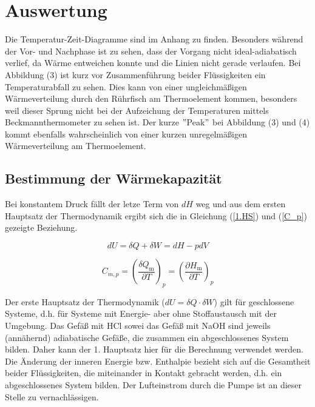 \documentclass[12pt,a4paper,titlepage,headinclude,bibtotoc]{scrartcl}
\begin{document}
\newpage
\section{Auswertung}
Die Temperatur-Zeit-Diagramme sind im Anhang zu finden. Besonders während der Vor- und Nachphase ist zu sehen, dass der Vorgang nicht ideal-adiabatisch verlief, da Wärme entweichen konnte und die Linien nicht gerade verlaufen. Bei Abbildung (3)
ist kurz vor Zusammenführung beider Flüssigkeiten ein Temperaturabfall zu sehen. Dies kann von einer ungleichmäßigen Wärmeverteilung durch den Rührfisch am Thermoelement kommen, besonders weil dieser Sprung nicht bei der Aufzeichung der Temperaturen mittels Beckmannthermometer zu sehen ist. Der kurze $"$Peak$"$ bei Abbildung (3)
und (4)
 kommt ebenfalls wahrscheinlich von einer kurzen unregelmäßigen Wärmeverteilung am Thermoelement.\\

\subsection{Bestimmung der Wärmekapazität}

Bei konstantem Druck fällt der letze Term von $dH$ weg und aus dem ersten Hauptsatz der Thermodynamik ergibt sich die in Gleichung (\ref{1.HS}) und (\ref{C_p}) gezeigte Beziehung.

\begin{equation} \label{1.HS}
dU= \delta Q+ \delta W= dH- pdV
\end{equation}

\begin{equation}\label{C_p}
C_{\mathit{m},p}= \left(\frac{\delta Q_\mathrm{m}}{\partial T}\right)_p =\left(\frac{\partial H_\mathrm{m}}{\partial T}\right)_p
\end{equation}

Der erste Hauptsatz der Thermodynamik ($dU= \delta Q \cdot \delta W$) gilt für geschlossene Systeme, d.h. für Systeme mit Energie- aber ohne Stoffaustausch mit der Umgebung. Das Gefäß mit HCl sowei das Gefäß mit NaOH sind jeweils (annähernd) adiabatische Gefäße, die zusammen ein abgeschlossenes System bilden. Daher kann der 1. Hauptsatz hier für die Berechnung verwendet werden. Die Änderung der inneren Energie bzw. Enthalpie bezieht sich auf die Gesamtheit beider Flüssigkeiten, die miteinander in Kontakt gebracht werden, d.h. ein abgeschlossenes System bilden. Der Lufteinstrom durch die Pumpe ist an dieser Stelle zu vernachlässigen.\\
\end{document}
